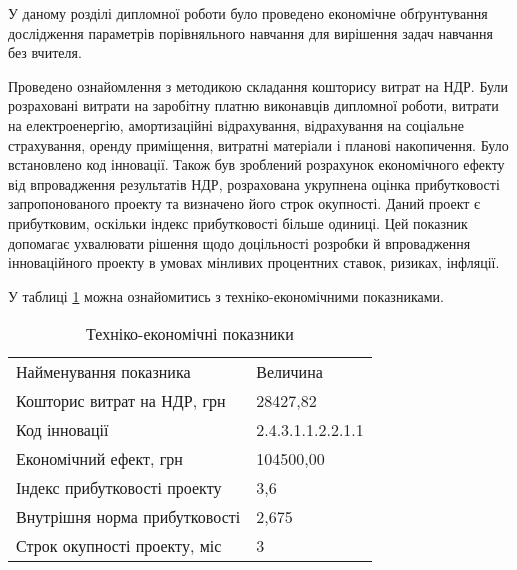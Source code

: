 У даному розділі дипломної роботи було проведено економічне обґрунтування дослідження параметрів порівняльного навчання для вирішення задач навчання без вчителя.

Проведено ознайомлення з методикою складання кошторису витрат на НДР. Були розраховані витрати на заробітну платню виконавців дипломної роботи, витрати на електроенергію, амортизаційні відрахування, відрахування на соціальне страхування, оренду приміщення, витратні матеріали і планові накопичення. Було встановлено код інновації. Також був зроблений розрахунок економічного ефекту від впровадження результатів НДР, розрахована укрупнена оцінка прибутковості запропонованого проекту та визначено його строк окупності. Даний проект є прибутковим, оскільки індекс прибутковості більше одиниці. Цей показник допомагає ухвалювати рішення щодо доцільності розробки й впровадження інноваційного проекту в умовах мінливих процентних ставок, ризиках, інфляції.

У таблиці \ref{tab:summary} можна ознайомитись з техніко-економічними показниками.

\begin{table}[h!]
	\captionstyle{ \raggedright}
	\caption{Техніко-економічні показники}\label{tab:summary}
	\begin{tabular}{| p{} | p{} |} 
		\hline
		Найменування показника & Величина \\
		\hlinewd{2pt}
		Кошторис витрат на НДР, грн & 28427,82 \\
		\hline
		Код інновації & 2.4.3.1.1.2.2.1.1 \\
		\hline
		Економічний ефект, грн & 104500,00 \\
		\hline
		Індекс прибутковості проекту & 3,6 \\
		\hline
		Внутрішня норма прибутковості & 2,675 \\
		\hline
		Строк окупності проекту, міс & 3 \\
		\hline
	\end{tabular}
\end{table}

